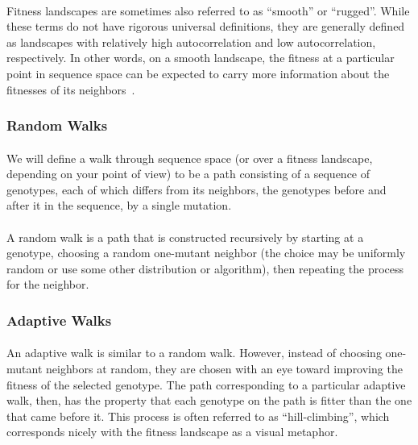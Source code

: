 \documentclass[12pt,letterpaper,titlepage]{article}
\begin{document}
\paragraph{}
Fitness landscapes are sometimes also referred to as ``smooth'' or ``rugged''.
While these terms do not have rigorous universal definitions, they are
generally defined as landscapes with relatively high autocorrelation and low
autocorrelation, respectively. In other words, on a smooth landscape, the
fitness at a particular point in sequence space can be expected to carry more
information about the fitnesses of its neighbors~\cite{Kauffman1993}.

\subsubsection{Random Walks}

\paragraph{}
We will define a walk through sequence space (or over a fitness landscape,
depending on your point of view) to be a path consisting of a sequence of
genotypes, each of which differs from its neighbors, the genotypes before and
after it in the sequence, by a single mutation.

\paragraph{}
A random walk is a path that is constructed recursively by starting at a
genotype, choosing a random one-mutant neighbor (the choice may be uniformly
random or use some other distribution or algorithm), then repeating the process
for the neighbor.

\subsubsection{Adaptive Walks}

\paragraph{}
An adaptive walk is similar to a random walk. However, instead of choosing
one-mutant neighbors at random, they are chosen with an eye toward improving
the fitness of the selected genotype. The path corresponding to a particular
adaptive walk, then, has the property that each genotype on the path is fitter
than the one that came before it. This process is often referred to as
``hill-climbing'', which corresponds nicely with the fitness landscape as a
visual metaphor.
\end{document}
